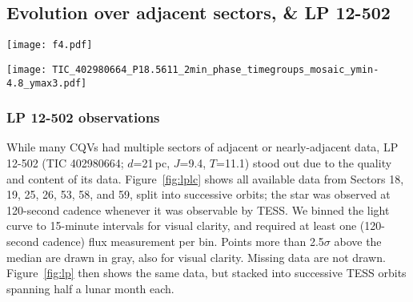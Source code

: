 \documentclass[11pt,twocolumn,tighten]{aastex63}
\begin{document}
\subsection{Evolution over adjacent sectors, \& LP 12-502}

\begin{figure*}[!tp]
	\begin{center}
		\centering
		\texttt{[image: f4.pdf]}
		\vspace{-0.4cm}
		\caption{
      {\bf LP 12-502 (TIC~402980664) light curve}, where each time
      chunk represents one TESS orbit.  Data were acquired in Sectors
      18-19, 25-26, 53, and 57-58.  Flares are drawn in gray.  The red
      vertical lines highlight apparently instantaneous state changes
      in the shape of the dip pattern.  The light curve is binned to
      15-minute intervals so that there are 96 points per day.  Data
      gaps with more than one missing 15-minute cadence appear in
      white.
		}
		\label{fig:lplc}
	\end{center}
\end{figure*}


\begin{figure*}[!t]
	\begin{center}
		\centering
		\texttt{[image: TIC\_402980664\_P18.5611\_2min\_phase\_timegroups\_mosaic\_ymin-4.8\_ymax3.pdf]}
		\vspace{-0.45cm}
		\caption{
      {\bf Evolution of LP 12-502} ($P$=18.6\,h) at fixed period and
      epoch over three years.  Each panel shows one (stacked) TESS
      orbit; small text denotes relative cycle number.  There are 200
      binned black points per cycle.  The TESS pointing law dictates
      time gaps; larger gaps tend to yield larger shape changes.  The
      dips usually evolve over tens to hundreds of cycles.  However
      cycles 1233-1264 show a dip that ``switched'' from a depth and
      duration of 3\% and 3\,hr to 0.3\% and 1\,hr over less than one
      cycle (cf.~Figure~\ref{fig:lplc}).
		}
		\label{fig:lp}
	\end{center}


\end{figure*}

\subsubsection{LP 12-502 observations}
While many CQVs had multiple sectors of adjacent or nearly-adjacent
data, LP 12-502 (TIC 402980664; $d$=21\,pc, $J$=9.4, $T$=11.1) stood
out due to the quality and content of its data.  Figure~\ref{fig:lplc}
shows all available data from Sectors 18, 19, 25, 26, 53, 58, and 59,
split into successive orbits; the star was observed at 120-second
cadence whenever it was observable by TESS.  We binned the light curve
to 15-minute intervals for visual clarity, and required at least one
(120-second cadence) flux measurement per bin.  Points more than
2.5$\sigma$ above the median are drawn in gray, also for visual
clarity.  Missing data are not drawn.  Figure~\ref{fig:lp} then shows
the same data, but stacked into successive TESS orbits spanning half a
lunar month each.
\end{document}
